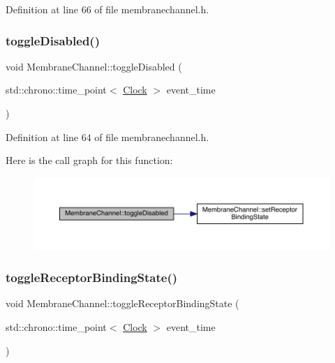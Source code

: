 Definition at line 66 of file membranechannel.\+h.

\mbox{\label{class_membrane_channel_aabbadec31782704dd497848154dfe0fc}} 
\subsubsection{\texorpdfstring{toggle\+Disabled()}{toggleDisabled()}}
{\footnotesize\ttfamily void Membrane\+Channel\+::toggle\+Disabled (\begin{DoxyParamCaption}\item[{std\+::chrono\+::time\+\_\+point$<$ \hyperlink{universe_8h_a0ef8d951d1ca5ab3cfaf7ab4c7a6fd80}{Clock} $>$}]{event\+\_\+time }\end{DoxyParamCaption})\hspace{0.3cm}{\ttfamily [inline]}}



Definition at line 64 of file membranechannel.\+h.

Here is the call graph for this function\+:
\nopagebreak
\begin{figure}[H]
\begin{center}
\leavevmode
\includegraphics[width=350pt]{class_membrane_channel_aabbadec31782704dd497848154dfe0fc_cgraph}
\end{center}
\end{figure}
\mbox{\label{class_membrane_channel_a289ec477e64eec5d2a1f88f4a677650c}} 
\subsubsection{\texorpdfstring{toggle\+Receptor\+Binding\+State()}{toggleReceptorBindingState()}}
{\footnotesize\ttfamily void Membrane\+Channel\+::toggle\+Receptor\+Binding\+State (\begin{DoxyParamCaption}\item[{std\+::chrono\+::time\+\_\+point$<$ \hyperlink{universe_8h_a0ef8d951d1ca5ab3cfaf7ab4c7a6fd80}{Clock} $>$}]{event\+\_\+time }\end{DoxyParamCaption})\hspace{0.3cm}{\ttfamily [inline]}}



